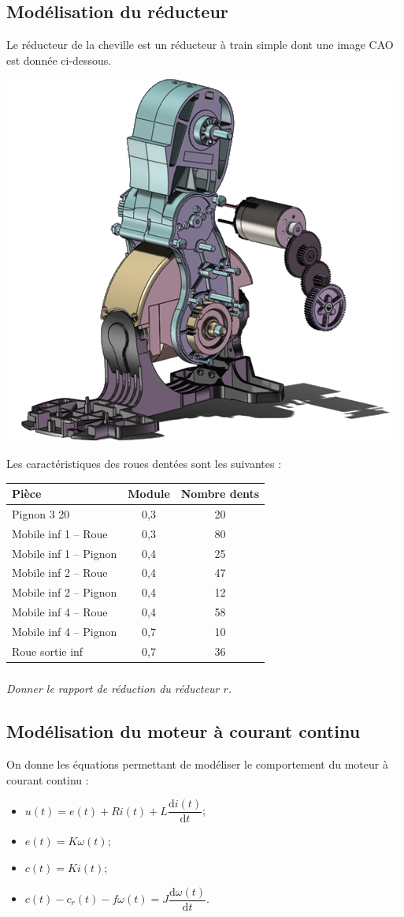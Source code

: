 \documentclass[10pt,fleqn]{article} %
\begin{document}
\begin{multicols}{2}
\subsection*{Modélisation du réducteur}
Le réducteur de la cheville est un réducteur à train simple dont une image CAO est donnée ci-dessous.
\begin{center}
\includegraphics[width=.7\linewidth]{images/fig_03}
\end{center}

Les caractéristiques des roues dentées sont les suivantes : 
\begin{center}
\begin{tabular}{|l|c|c|}
\hline
Pièce & Module & Nombre dents \\ \hline
Pignon 3 20              & 0,3 & 20 \\ \hline
Mobile inf 1 -- Roue    & 0,3 & 80 \\ \hline
Mobile inf 1 -- Pignon  & 0,4 & 25 \\ \hline
Mobile inf 2 -- Roue    & 0,4 & 47 \\ \hline
Mobile inf 2 -- Pignon  & 0,4 & 12 \\ \hline
Mobile inf 4 -- Roue    & 0,4 & 58 \\ \hline
Mobile inf 4 -- Pignon   & 0,7 & 10 \\ \hline
Roue sortie inf          & 0,7 & 36 \\ \hline
\end{tabular}
\end{center}


\subparagraph{}\textit{Donner le rapport de réduction du réducteur $r$.}

\subsection*{Modélisation du moteur à courant continu}
On donne les équations permettant de modéliser le comportement du moteur à courant continu :
\begin{itemize}
\item $u(t) = e(t)+ Ri(t) +L \dfrac{\text{d}i(t)}{\text{d} t}$;
\item $e(t)=K\omega(t)$;
\item $c(t)=Ki(t)$;
\item $c(t)-c_r(t) - f\omega(t)=J\dfrac{\text{d}\omega(t)}{\text{d} t}$.
\end{itemize}


\end{multicols}
\end{document}
